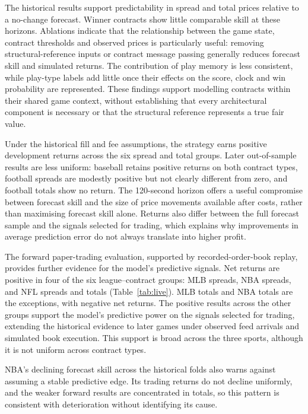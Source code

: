 \documentclass[12pt,a4paper,oneside]{report}
\begin{document}
The historical results support predictability in spread and total prices
relative to a no-change forecast. Winner contracts show little comparable
skill at these horizons. Ablations indicate that the relationship between the
game state, contract thresholds and observed prices is particularly useful:
removing structural-reference inputs or contract message passing generally
reduces forecast skill and simulated returns. The contribution of play memory
is less consistent, while play-type labels add little once their effects on
the score, clock and win probability are represented. These findings support
modelling contracts within their shared game context, without establishing
that every architectural component is necessary or that the structural
reference represents a true fair value.

Under the historical fill and fee assumptions, the strategy earns positive
development returns across the six spread and total groups. Later out-of-sample
results are less uniform: baseball retains positive returns on both contract
types, football spreads are modestly positive but not clearly different from zero,
and football totals show no return. The
120-second horizon offers a useful compromise between forecast skill and
the size of price movements available after costs, rather than maximising
forecast skill alone. Returns also differ between the full forecast sample
and the signals selected for trading, which explains why improvements in
average prediction error do not always translate into higher profit.

The forward paper-trading evaluation, supported by recorded-order-book replay,
provides further evidence for the model's predictive signals. Net returns are
positive in four of the six league--contract groups: MLB spreads, NBA spreads,
and NFL spreads and totals (Table~\ref{tab:live}). MLB totals and NBA totals are
the exceptions, with negative net returns. The positive results across the
other groups support the model's predictive power on the signals selected
for trading, extending the historical evidence to later games under observed
feed arrivals and simulated book execution. This support is broad across the
three sports, although it is not uniform across contract types.

NBA's declining forecast skill across the historical folds also warns against
assuming a stable predictive edge. Its trading returns do not decline
uniformly, and the weaker forward results are concentrated in totals, so
this pattern is consistent with deterioration without identifying its cause.
\end{document}
